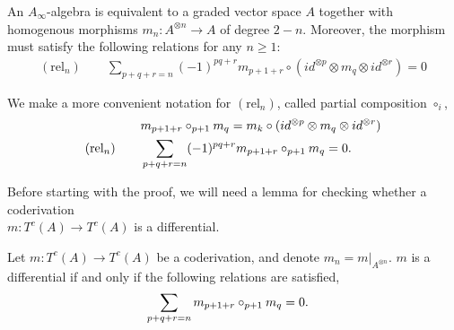 \documentclass[../thesis.tex]{subfiles}
\begin{document}
        \begin{proposition}\label{prop: A-infinity def}
            An $A_\infty$-algebra is equivalent to a graded vector space $A$ together with homogenous morphisms $m_n:A^{\otimes n}\rightarrow A$ of degree $2-n$. Moreover, the morphism must satisfy the following relations for any $n\geq 1$:
            \begin{align*}
                (\text{rel}_n)\qquad \sum_{p+q+r = n}(-1)^{pq+r}m_{p+1+r}\circ (id^{\otimes p}\otimes m_q \otimes id^{\otimes r}) = 0
            \end{align*}
        \end{proposition}

        \begin{remark}
            We make a more convenient notation for $(\text{rel}_n)$, called partial composition $\circ_i$,
            \begin{align*}
                & m_{p+1+r} \circ_{p+1} m_q = m_k \circ (id^{\otimes p}\otimes m_q \otimes id^{\otimes r}) \\
                (\text{rel}_n)\qquad & \sum_{p+q+r = n} (-1)^{pq+r} m_{p+1+r} \circ_{p+1} m_q = 0\tt{.}
            \end{align*}
        \end{remark}

        Before starting with the proof, we will need a lemma for checking whether a coderivation \\ $m: T^c(A) \rightarrow T^c(A)$ is a differential.

        \begin{lemma}\label{lem: coderivation-is-diff?}
            Let $m: T^c(A) \rightarrow T^c(A)$ be a coderivation, and denote $m_n = m|_{A^{\otimes n}}$. $m$ is a differential if and only if the following relations are satisfied,
            \begin{align*}
                & \sum_{p+q+r = n}m_{p+1+r}\circ_{p+1}m_q = 0\tt{.}
            \end{align*}
        \end{lemma}
\end{document}
